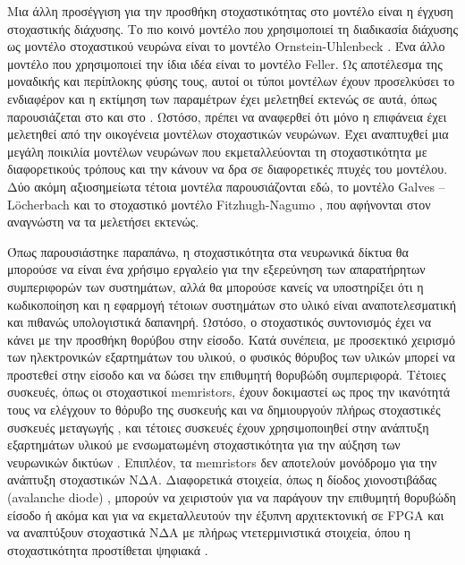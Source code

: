\documentclass[12pt]{report}
\begin{document}
Μια άλλη προσέγγιση για την προσθήκη στοχαστικότητας στο μοντέλο είναι η έγχυση στοχαστικής διάχυσης. Το πιο κοινό μοντέλο που χρησιμοποιεί τη διαδικασία διάχυσης ως μοντέλο στοχαστικού νευρώνα είναι το μοντέλο \textlatin{Ornstein-Uhlenbeck} \cite{Lansky1995}. Ένα άλλο μοντέλο που χρησιμοποιεί την ίδια ιδέα είναι το μοντέλο \textlatin{Feller}. Ως αποτέλεσμα της μοναδικής και περίπλοκης φύσης τους, αυτοί οι τύποι μοντέλων έχουν προσελκύσει το ενδιαφέρον και η εκτίμηση των παραμέτρων έχει μελετηθεί εκτενώς σε αυτά, όπως παρουσιάζεται στο \cite{Ditlevsen2006} και στο \cite{Lansky2008}. Ωστόσο, πρέπει να αναφερθεί ότι μόνο η επιφάνεια έχει μελετηθεί από την οικογένεια μοντέλων στοχαστικών νευρώνων. Έχει αναπτυχθεί μια μεγάλη ποικιλία μοντέλων νευρώνων που εκμεταλλεύονται τη στοχαστικότητα με διαφορετικούς τρόπους και την κάνουν να δρα σε διαφορετικές πτυχές του μοντέλου. Δύο ακόμη αξιοσημείωτα τέτοια μοντέλα παρουσιάζονται εδώ, το μοντέλο \textlatin{Galves – Löcherbach} \cite{Galves2013} και το στοχαστικό μοντέλο \textlatin{Fitzhugh-Nagumo} \cite{Tuckwell1998}, που αφήνονται στον αναγνώστη να τα μελετήσει εκτενώς.

Όπως παρουσιάστηκε παραπάνω, η στοχαστικότητα στα νευρωνικά δίκτυα θα μπορούσε να είναι ένα χρήσιμο εργαλείο για την εξερεύνηση των απαρατήρητων συμπεριφορών των συστημάτων, αλλά θα μπορούσε κανείς να υποστηρίξει ότι η κωδικοποίηση και η εφαρμογή τέτοιων συστημάτων στο υλικό είναι αναποτελεσματική και πιθανώς υπολογιστικά δαπανηρή. Ωστόσο, ο στοχαστικός συντονισμός έχει να κάνει με την προσθήκη θορύβου στην είσοδο. Κατά συνέπεια, με προσεκτικό χειρισμό των ηλεκτρονικών εξαρτημάτων του υλικού, ο φυσικός θόρυβος των υλικών μπορεί να προστεθεί στην είσοδο και να δώσει την επιθυμητή θορυβώδη συμπεριφορά. Τέτοιες συσκευές, όπως οι στοχαστικοί \textlatin{memristors}, έχουν δοκιμαστεί ως προς την ικανότητά τους να ελέγχουν το θόρυβο της συσκευής και να δημιουργούν πλήρως στοχαστικές συσκευές μεταγωγής \cite{Gaba2013}, και τέτοιες συσκευές έχουν χρησιμοποιηθεί στην ανάπτυξη εξαρτημάτων υλικού με ενσωματωμένη στοχαστικότητα για την αύξηση των νευρωνικών δικτύων \cite{Maruan2015}. Επιπλέον, τα \textlatin{memristors} δεν αποτελούν μονόδρομο για την ανάπτυξη στοχαστικών ΝΔΑ. Διαφορετικά στοιχεία, όπως η δίοδος χιονοστιβάδας (\textlatin{avalanche diode}) \cite{Clayton2011}, μπορούν να χειριστούν για να παράγουν την επιθυμητή θορυβώδη είσοδο ή ακόμα και για να εκμεταλλευτούν την έξυπνη αρχιτεκτονική σε \textlatin{FPGA} και να αναπτύξουν στοχαστικά ΝΔΑ με πλήρως ντετερμινιστικά στοιχεία, όπου η στοχαστικότητα προστίθεται ψηφιακά \cite{Josep2012}.
\end{document}

